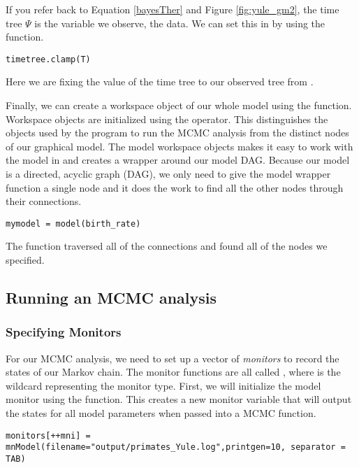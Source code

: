 If you refer back to Equation \ref{bayesTher} and Figure \ref{fig:yule_gm2}, the time tree $\Psi$ is the variable we observe, \IE the data. 
We can set this in \Rev by using the  function.
{\tt \begin{snugshade*}
\begin{lstlisting}
timetree.clamp(T)
\end{lstlisting}
\end{snugshade*}}
Here we are fixing the value of the time tree to our observed tree from \citet{Springer2012}.

Finally, we can create a workspace object of our whole model using the  function. 
Workspace objects are initialized using the \cl{=} operator. This distinguishes the objects used by the program to run the MCMC analysis from the distinct nodes of our graphical model.
The model workspace objects makes it easy to work with the model in \Rev and creates a wrapper around our model DAG. 
Because our model is a directed, acyclic graph (DAG), we only need to give the model wrapper function a single node and it does the work to find all the other nodes through their connections.
{\tt \begin{snugshade*}
\begin{lstlisting}
mymodel = model(birth_rate)
\end{lstlisting}
\end{snugshade*}}

The  function traversed all of the connections and found all of the nodes we specified. 


\subsection{Running an MCMC analysis}

\subsubsection{Specifying Monitors}

For our MCMC analysis, we need to set up a vector of \textit{monitors} to record the states of our Markov chain. 
The monitor functions are all called , where \cl{*} is the wildcard representing the monitor type.
First, we will initialize the model monitor using the  function. This creates a new monitor variable that will output the states for all model parameters when passed into a MCMC function. 
{\tt \begin{snugshade*}
\begin{lstlisting}
monitors[++mni] = mnModel(filename="output/primates_Yule.log",printgen=10, separator = TAB)
\end{lstlisting}
\end{snugshade*}}

